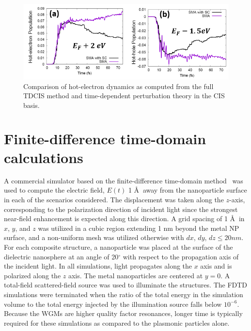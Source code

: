 \documentclass[journal=jpclcd,manuscript=suppinfo]{achemso}
\begin{document}
\begin{figure}
\begin{center}
\includegraphics[width=6in]{Ag_SC_Compare.png}
\caption{Comparison of hot-electron dynamics as computed from the full TDCIS method and time-dependent perturbation theory in
the CIS basis. }
\end{center}
\end{figure}


\section{Finite-difference time-domain calculations}
A commercial simulator based on the finite-difference time-domain method~\cite{Lumerical} was used to compute the electric field, $E(t)$
1 \AA $\:$  
away from the nanoparticle surface in each of the scenarios considered.  The displacement
was taken along the $z$-axis, corresponding to the polarization direction of incident light since the strongest
near-field enhancement is expected along this direction.  A grid spacing of 1 \AA $\:$  
in $x$, $y$, and $z$ was utilized
in a cubic region extending 1 nm beyond the metal NP surface, and a non-uniform mesh was utilized otherwise with $dx$, $dy$, $dz \leq 20 nm$.
For each composite structure, a nanoparticle was placed at the surface of the dielectric nanosphere at an angle of
20$^{\circ}$ with respect to the propagation axis of the incident light. In all simulations, light propagates
along the $x$ axis and is polarized along the $z$ axis.  The metal nanoparticles are centered at $y=0$.  
A total-field scattered-field source was used to illuminate the structures.  The FDTD simulations were terminated when the 
ratio of the total energy in the simulation volume to the total energy injected by the illumination source falls below
$10^{-6}$.  Because the WGMs are higher quality factor resonances, longer time is typically required for these simulations
as compared to the plasmonic particles alone.  
\end{document}
